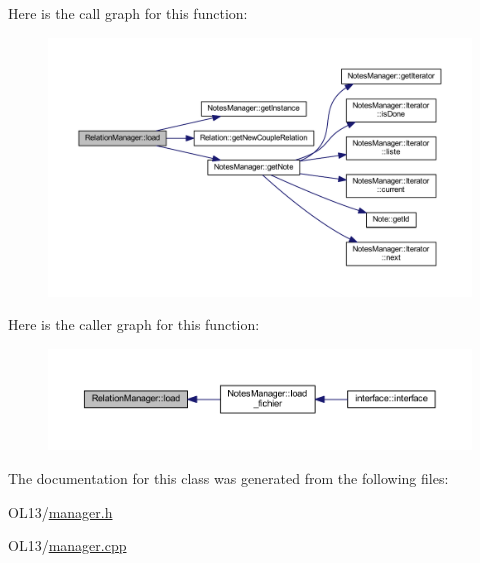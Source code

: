 Here is the call graph for this function\+:\nopagebreak
\begin{figure}[H]
\begin{center}
\leavevmode
\includegraphics[width=350pt]{class_relation_manager_a37273bc4c1d223bf99ff10ba7feba50a_cgraph}
\end{center}
\end{figure}
Here is the caller graph for this function\+:\nopagebreak
\begin{figure}[H]
\begin{center}
\leavevmode
\includegraphics[width=350pt]{class_relation_manager_a37273bc4c1d223bf99ff10ba7feba50a_icgraph}
\end{center}
\end{figure}


The documentation for this class was generated from the following files\+:\begin{DoxyCompactItemize}
\item 
O\+L13/\hyperlink{manager_8h}{manager.\+h}\item 
O\+L13/\hyperlink{manager_8cpp}{manager.\+cpp}\end{DoxyCompactItemize}
